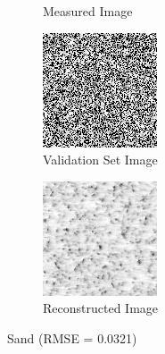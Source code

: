 \documentclass[a4paper]{article}
\begin{document}
\begin{figure}[H]
\begin{subfigure}{0.23\linewidth}
		\caption{Measured Image}
	\end{subfigure}
	\begin{subfigure}{0.23\linewidth}
		\centering
		\includegraphics[width=\linewidth]{../media/Q3 textture_sand validation.png}
		\caption{Validation Set Image}
	\end{subfigure}
	\begin{subfigure}{0.23\linewidth}
		\centering
		\includegraphics[width=\linewidth]{../media/Q3 textture_sand reconstructed.png}
		\caption{Reconstructed Image}
	\end{subfigure}
	\caption{Sand (RMSE = 0.0321)}
\end{figure}
\end{document}
